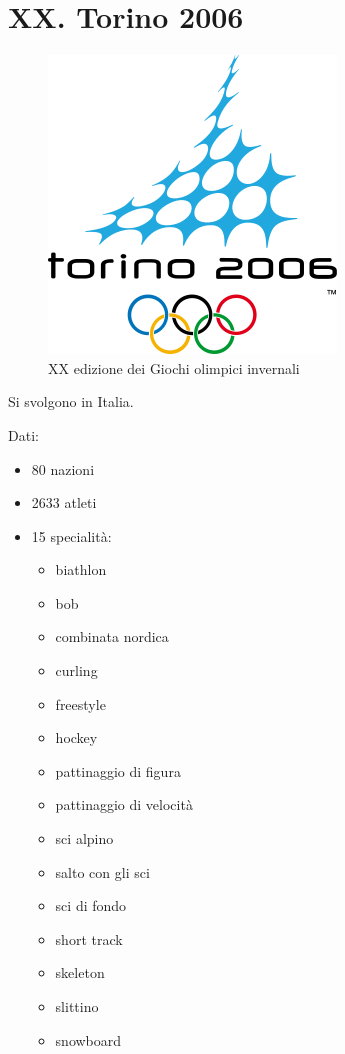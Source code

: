 \documentclass[
]{book}
\providecommand{\tightlist}{%
  \setlength{\itemsep}{0pt}\setlength{\parskip}{0pt}}
\begin{document}
\chapter*{XX. Torino 2006}\label{xx.-torino-2006}

\begin{figure}
\includegraphics[width=0.4\linewidth]{images/loghi/2006} \caption{XX edizione dei Giochi olimpici invernali}\label{fig:unnamed-chunk-75}
\end{figure}

Si svolgono in Italia.

Dati:

\begin{itemize}
\tightlist
\item
  80 nazioni
\item
  2633 atleti
\item
  15 specialità:

  \begin{itemize}
  \tightlist
  \item
    biathlon
  \item
    bob
  \item
    combinata nordica
  \item
    curling
  \item
    freestyle
  \item
    hockey
  \item
    pattinaggio di figura
  \item
    pattinaggio di velocità
  \item
    sci alpino
  \item
    salto con gli sci
  \item
    sci di fondo
  \item
    short track
  \item
    skeleton
  \item
    slittino
  \item
    snowboard
  \end{itemize}
\end{itemize}
\end{document}
